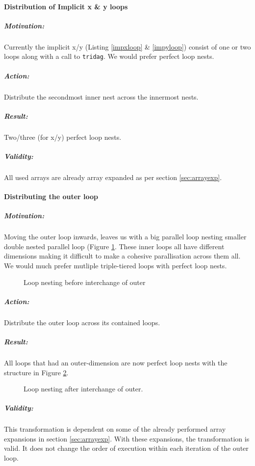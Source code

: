 \paragraph{Distribution of Implicit x \& y loops}
\subparagraph{Motivation:} Currently the implicit x/y (Listing \ref{impxloop} \& \ref{impyloop}) consist of one or two loops along with a call
 to \verb!tridag!. We would prefer perfect loop nests.
\subparagraph{Action:} Distribute the secondmost inner nest across the innermost nests.
\subparagraph{Result:} Two/three (for x/y) perfect loop nests.
\subparagraph{Validity:} All used arrays are already array expanded as per section \ref{sec:arrayexp}.
\paragraph{Distributing the outer loop}
\subparagraph{Motivation:} Moving the outer loop inwards, leaves us with a big parallel loop nesting smaller double nested parallel loop
 (Figure \ref{fig:bintouter}.
 These inner loops all have different dimensions making it difficult to make a cohesive parallisation across them all. We would much
 prefer mutliple triple-tiered loops with perfect loop nests.\\
 \begin{figure}[h!]
   \centering
{}
   \caption{Loop nesting before interchange of outer}
   \label{fig:bintouter}
 \end{figure}
\subparagraph{Action:} Distribute the outer loop across its contained loops.
\subparagraph{Result:} All loops that had an outer-dimension are now perfect loop nests with the structure in Figure \ref{fig:aintouter}.
\begin{figure}[h!]
  \centering
{}
  \caption{Loop nesting after interchange of outer.}
  \label{fig:aintouter}
\end{figure}
\subparagraph{Validity:} This transformation is dependent on some of the already performed array expansions in section \ref{sec:arrayexp}.
 With these expansions, the transformation is valid. It does not change the order of execution within each iteration of the outer loop.
